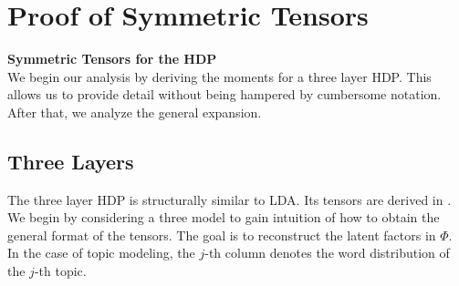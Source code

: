 \documentclass[twoside,11pt]{article}
\begin{document}
{%



\vskip 0.2in
%
%
%
%


\newpage
\appendix
\label{app:theorem}
\section{Proof of Symmetric Tensors}


{\bf Symmetric Tensors for the HDP}\\
We begin our analysis by deriving the moments for a three layer
HDP. This allows us to provide detail without being hampered by
cumbersome notation. After that, we analyze the general expansion. 

\subsection{Three Layers}
The three layer HDP is structurally similar to LDA. Its tensors 
are derived in \cite{AnaFosHsuKakLiu12}. We begin by considering 
a three model to gain intuition of how to obtain the
general format of the tensors. The goal is to reconstruct the latent
factors in $\Phi$. In the case of topic modeling, the $j$-th column
denotes the word distribution of the $j$-th topic.  

}
\end{document}

